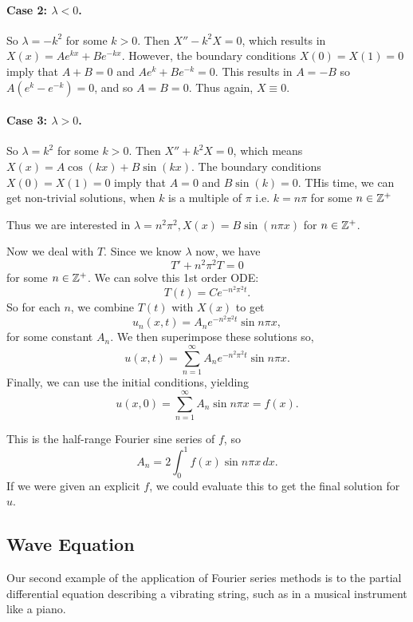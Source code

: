 \paragraph{Case 2: \(\lambda < 0\).}
So \(\lambda = -k^2\) for some \(k > 0\). Then \(X'' -k^2X = 0\), which results in \(X(x) = Ae^{kx} + Be^{-kx}\). However, the boundary conditions \(X(0) = X(1) = 0\) imply that \(A + B = 0\) and \(Ae^k + Be^{-k} = 0\). This results in \(A = -B\) so \(A(e^k - e^{-k}) = 0\), and so \(A = B = 0\). Thus again, \(X \equiv 0\).

\paragraph{Case 3: \(\lambda > 0\).}
So \(\lambda = k^2\) for some \(k > 0\). Then \(X'' + k^2X = 0\), which means \(X(x) = A\cos(kx) + B\sin(kx)\). The boundary conditions \(X(0) = X(1) = 0\) imply that \(A = 0\) and \(B\sin(k) = 0\). THis time, we can get non-trivial solutions, when \(k\) is a multiple of \(\pi\) i.e. \(k = n\pi\) for some \(n \in \mathbb{Z}^+\)

Thus we are interested in \(\lambda = n^2\pi^2, X(x) = B\sin(n\pi x)\) for \(n \in \mathbb{Z}^+\).

Now we deal with \(T\). Since we know \(\lambda\) now, we have
\[T' + n^2\pi^2 T = 0\]
for some \(n \in \mathbb{Z}^+\). We can solve this 1st order ODE:
\[T(t) = Ce^{-n^2\pi^2t}.\]
So for each \(n\), we combine \(T(t)\) with \(X(x)\) to get
\[u_n(x, t) = A_n e^{-n^2\pi^2 t} \sin n\pi x,\]
for some constant \(A_n\). We then superimpose these solutions so,
\[u(x, t) = \sum_{n=1}^{\infty} A_n e^{-n^2\pi^2 t} \sin n\pi x.\]
Finally, we can use the initial conditions, yielding
\[u(x, 0) = \sum_{n=1}^{\infty} A_n \sin n\pi x = f(x).\]

This is the half-range Fourier sine series of \(f\), so
\[A_n = 2 \int_0^1 f(x) \sin n\pi x \, dx.\]
If we were given an explicit \(f\), we could evaluate this to get the final solution for \(u\).

\subsection{Wave Equation}
Our second example of the application of Fourier series methods is to the partial differential equation describing a vibrating string, such as in a musical instrument like a piano. \\


